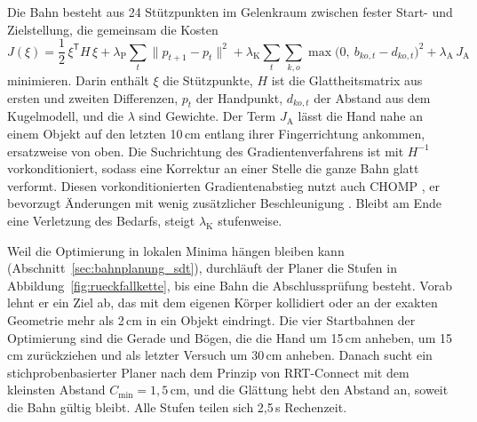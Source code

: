 Die Bahn besteht aus 24 Stützpunkten im Gelenkraum zwischen fester Start- und Zielstellung, die gemeinsam die Kosten
\begin{equation}
  J(\xi) = \frac{1}{2}\,\xi^\mathsf{T} H\,\xi
  + \lambda_\mathrm{P} \sum_{t} \| p_{t+1} - p_t \|^2
  + \lambda_\mathrm{K} \sum_{t} \sum_{k,o} \max\bigl(0,\ b_{ko,t} - d_{ko,t}\bigr)^2
  + \lambda_\mathrm{A}\, J_\mathrm{A}
  \label{eq:planerkosten}
\end{equation}
%
minimieren.
Darin enthält $\xi$ die Stützpunkte, $H$ ist die Glattheitsmatrix aus ersten und zweiten Differenzen, $p_t$ der Handpunkt, $d_{ko,t}$ der Abstand aus dem Kugelmodell, und die $\lambda$ sind Gewichte.
Der Term $J_\mathrm{A}$ lässt die Hand nahe an einem Objekt auf den letzten 10\,cm entlang ihrer Fingerrichtung ankommen, ersatzweise von oben.
Die Suchrichtung des Gradientenverfahrens ist mit $H^{-1}$ vorkonditioniert, sodass eine Korrektur an einer Stelle die ganze Bahn glatt verformt.
Diesen vorkonditionierten Gradientenabstieg nutzt auch CHOMP \cite{Schulman2014}, er bevorzugt Änderungen mit wenig zusätzlicher Beschleunigung \cite{Zucker2013}.
Bleibt am Ende eine Verletzung des Bedarfs, steigt $\lambda_\mathrm{K}$ stufenweise.

Weil die Optimierung in lokalen Minima hängen bleiben kann (Abschnitt~\ref{sec:bahnplanung_sdt}), durchläuft der Planer die Stufen in Abbildung~\ref{fig:rueckfallkette}, bis eine Bahn die Abschlussprüfung besteht.
Vorab lehnt er ein Ziel ab, das mit dem eigenen Körper kollidiert oder an der exakten Geometrie mehr als 2\,cm in ein Objekt eindringt.
Die vier Startbahnen der Optimierung sind die Gerade und Bögen, die die Hand um 15\,cm anheben, um 15\,cm zurückziehen und als letzter Versuch um 30\,cm anheben.
Danach sucht ein stichprobenbasierter Planer nach dem Prinzip von RRT-Connect \cite{Kuffner2000} mit dem kleinsten Abstand $C_\mathrm{min} = 1{,}5$\,cm, und die Glättung hebt den Abstand an, soweit die Bahn gültig bleibt.
Alle Stufen teilen sich 2,5\,s Rechenzeit.

